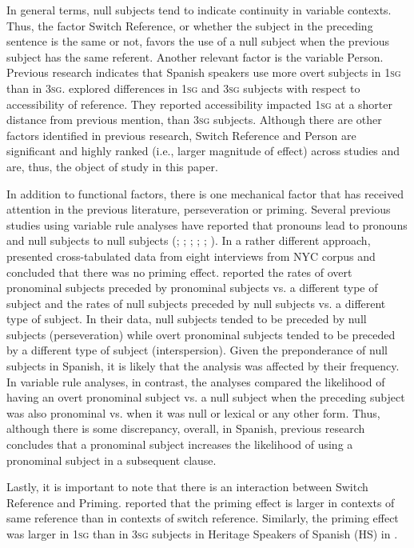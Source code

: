 \documentclass[output=paper,colorlinks,citecolor=brown,draftmode]{langscibook}
\begin{document}
In general terms, null subjects tend to indicate continuity in variable contexts. Thus, the factor Switch Reference, or whether the subject in the preceding sentence is the same or not, favors the use of a null subject when the previous subject has the same referent. Another relevant factor is the variable Person. Previous research indicates that Spanish speakers use more overt subjects in 1\textsc{sg} than in 3\textsc{sg}. \citet{TravisCacoullos2018} explored differences in 1\textsc{sg} and 3\textsc{sg} subjects with respect to accessibility of reference. They reported accessibility impacted 1\textsc{sg} at a shorter distance from previous mention, than 3\textsc{sg} subjects. Although there are other factors identified in previous research, Switch Reference and Person are significant and highly ranked (i.e., larger magnitude of effect) across studies and are, thus, the object of study in this paper.

In addition to functional factors, there is one mechanical factor that has received attention in the previous literature, perseveration or priming. Several previous studies using variable rule analyses have reported that pronouns lead to pronouns and null subjects to null subjects (\citealp{Abreu2012}; \citealp{Cameron1994}; \citealp{CameronFlores-Ferrán2004}; \citealp{FloresFerrán2002}; \citealp{TravisCacoullos2012}; \citealp{Travis2007}). In a rather different approach, \citet{Otheguy2015} presented cross-tabulated data from eight interviews from  NYC corpus and concluded that there was no priming effect. \citet{Otheguy2015} reported the rates of overt pronominal subjects preceded by pronominal subjects vs. a different type of subject and the rates of null subjects preceded by null subjects vs. a different type of subject. In their data, null subjects tended to be preceded by null subjects (perseveration) while overt pronominal subjects tended to be preceded by a different type of subject (interspersion). Given the preponderance of null subjects in Spanish, it is likely that the analysis was affected by their frequency. In variable rule analyses, in contrast, the analyses compared the likelihood of having an overt pronominal subject vs. a null subject when the preceding subject was also pronominal vs. when it was null or lexical or any other form. Thus, although there is some discrepancy, overall, in Spanish, previous research concludes that a pronominal subject increases the likelihood of using a pronominal subject in a subsequent clause.

Lastly, it is important to note that there is an interaction between Switch Reference and Priming. \citet{CameronFlores-Ferrán2004} reported that the priming effect is larger in contexts of same reference than in contexts of switch reference. Similarly, the priming effect was larger in 1\textsc{sg} than in 3\textsc{sg} subjects in Heritage Speakers of Spanish (HS) in \citet{PradaPérez2020}.
\end{document}
